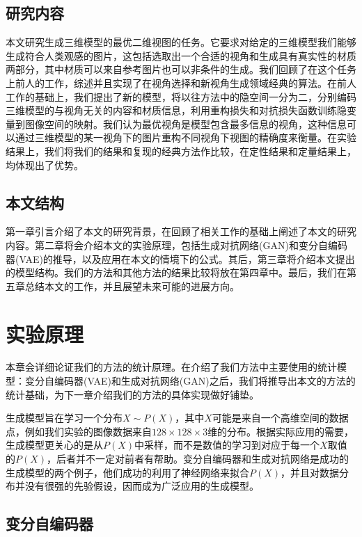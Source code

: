 \documentclass[UTF8,openany,AutoFakeBold,AutoFakeSlant,cs4size]{ctexbook}
\begin{document}
\section{研究内容}

本文研究生成三维模型的最优二维视图的任务。它要求对给定的三维模型我们能够生成符合人类观感的图片，这包括选取出一个合适的视角和生成具有真实性的材质两部分，其中材质可以来自参考图片也可以非条件的生成。我们回顾了在这个任务上前人的工作，综述并且实现了在视角选择和新视角生成领域经典的算法。在前人工作的基础上，我们提出了新的模型，将以往方法中的隐空间一分为二，分别编码三维模型的与视角无关的内容和材质信息，利用重构损失和对抗损失函数训练隐变量到图像空间的映射。我们认为最优视角是模型包含最多信息的视角，这种信息可以通过三维模型的某一视角下的图片重构不同视角下视图的精确度来衡量。在实验结果上，我们将我们的结果和复现的经典方法作比较，在定性结果和定量结果上，均体现出了优势。

\section{本文结构}

第一章引言介绍了本文的研究背景，在回顾了相关工作的基础上阐述了本文的研究内容。第二章将会介绍本文的实验原理，包括生成对抗网络(GAN)和变分自编码器(VAE)的推导，以及应用在本文的情境下的公式。其后，第三章将介绍本文提出的模型结构。我们的方法和其他方法的结果比较将放在第四章中。最后，我们在第五章总结本文的工作，并且展望未来可能的进展方向。



\clearpage

\chapter{实验原理}

本章会详细论证我们的方法的统计原理。在介绍了我们方法中主要使用的统计模型：变分自编码器(VAE)\cite{kingma2014autoencoding}和生成对抗网络(GAN)\cite{NIPS2014_5423}之后，我们将推导出本文的方法的统计基础，为下一章介绍我们的方法的具体实现做好铺垫。

生成模型旨在学习一个分布$X \sim P(X)$，其中$X$可能是来自一个高维空间的数据点，例如我们实验的图像数据来自$128 \times 128 \times 3$维的分布。根据实际应用的需要，生成模型更关心的是从$P(X)$中采样，而不是数值的学习到对应于每一个$X$取值的$P(X)$，后者并不一定对前者有帮助。变分自编码器和生成对抗网络是成功的生成模型的两个例子，他们成功的利用了神经网络来拟合$P(X)$，并且对数据分布并没有很强的先验假设，因而成为广泛应用的生成模型。

\section{变分自编码器}
\end{document}
